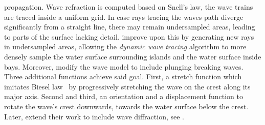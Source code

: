 propagation. Wave refraction is computed based on Snell's law, the wave trains
are traced inside a uniform grid. In case rays tracing the waves path diverge
significantly from a straight line, there may remain undersampled areas,
leading to parts of the surface lacking detail. \cite{Gonzato:1997} improve
upon this by generating new rays in undersampled areas, allowing the
\emph{dynamic wave tracing} algorithm to more densely sample the water surface
surrounding islands and the water surface inside bays. Moreover,
\citeauthor{Gonzato:1997} modify the wave model to include plunging breaking
waves. Three additional functions achieve said goal.
First, a stretch function which imitates Biesel law~\citep{Biesel:1952} by
progressively stretching the wave on the crest along its major axis. Second and
third, an orientation and a displacement function to rotate the wave's crest
downwards, towards the water surface below the crest. Later,
\citeauthor{Gonzato:2000} extend their work to include wave diffraction, see
\cite{Gonzato:2000}.
%
